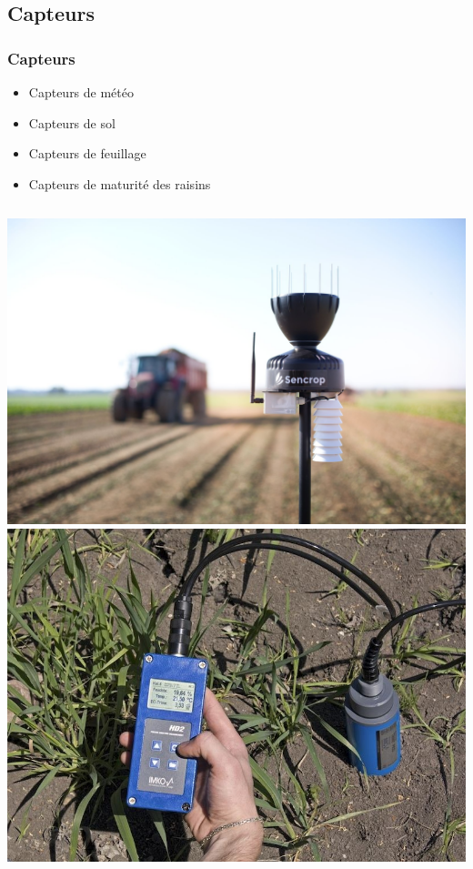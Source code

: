 \documentclass{beamer}
\begin{document}
	\subsection{Capteurs}


	\begin{frame}
	\frametitle{Capteurs}
	\begin{itemize}
		\item Capteurs de météo
		\item Capteurs de sol
		\item Capteurs de feuillage
		\item Capteurs de maturité des raisins
	\end{itemize}


		\begin{columns}[c]
	\centering
	\includegraphics[width=\textwidth]{meteo}
	\centering
	\includegraphics[width=\textwidth]{sol}

\end{columns}
\end{frame}
\end{document}
